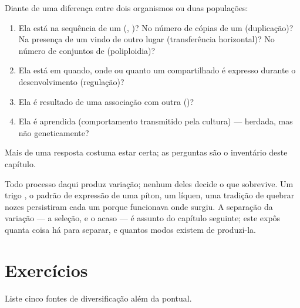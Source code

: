 \begin{method}\label{met:g12:diversification-of-life:name}
Diante de uma diferença entre dois organismos ou duas populações:
\begin{enumerate}
  \item Ela está na sequência de um  (, )? No número de
        cópias de um  (duplicação)? Na presença de um  vindo de
        outro lugar (transferência horizontal)? No número de conjuntos
        de  (poliploidia)?
  \item Ela está em quando, onde ou quanto um  compartilhado é
        expresso durante o desenvolvimento (regulação)?
  \item Ela é resultado de uma associação com outra  ()?
  \item Ela é aprendida (comportamento transmitido pela cultura) ---
        herdada, mas não geneticamente?
\end{enumerate}
Mais de uma resposta costuma estar certa; as perguntas são o inventário
deste capítulo.
\end{method}

\begin{remark}\label{rem:g12:diversification-of-life:selection}
Todo processo daqui produz variação; nenhum deles decide o que
sobrevive. Um trigo , o padrão de expressão de uma píton, um
líquen, uma tradição de quebrar nozes persistiram cada um porque
funcionava onde surgiu. A separação da variação --- a seleção, e o
acaso --- é assunto do capítulo seguinte; este expôs quanta coisa há
para separar, e quantos modos existem de produzi-la.
\end{remark}

\section{Exercícios}

\begin{exercise}[$\star$]\label{exo:g12:diversification-of-life:1}
Liste cinco fontes de diversificação além da  pontual.
\end{exercise}

